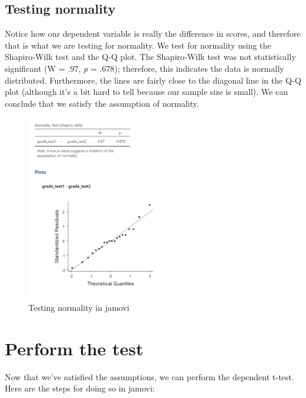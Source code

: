 \documentclass[
]{book}
\begin{document}
\hypertarget{testing-normality-1}{%
\subsection{Testing normality}\label{testing-normality-1}}

Notice how our dependent variable is really the difference in scores, and therefore that is what we are testing for normality. We test for normality using the Shapiro-Wilk test and the Q-Q plot. The Shapiro-Wilk test was not statistically significant (W = .97, \emph{p} = .678); therefore, this indicates the data is normally distributed. Furthermore, the lines are fairly close to the diagonal line in the Q-Q plot (although it's a bit hard to tell because our sample size is small). We can conclude that we satisfy the assumption of normality.

\begin{figure}

{\centering \includegraphics[width=1\linewidth]{images/03_dependent_t-test/dependent_normality} 

}

\caption{Testing normality in jamovi}\label{fig:unnamed-chunk-5}
\end{figure}

\hypertarget{perform-the-test-1}{%
\section{Perform the test}\label{perform-the-test-1}}

Now that we've satisfied the assumptions, we can perform the dependent t-test. Here are the steps for doing so in jamovi:
\end{document}
